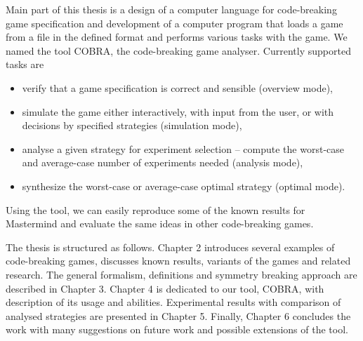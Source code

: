 Main part of this thesis is a design of a computer language for
  code-breaking game specification
  and development of a computer program that
  loads a game from a file in the defined format
  and performs various tasks with the game.
We named the tool COBRA, the code-breaking game analyser.
Currently supported tasks are
\begin{itemize}
\item verify that a game specification is correct
  and sensible (overview mode),
\item simulate the game either interactively, with input from the user, or
  with decisions by specified strategies (simulation mode),
\item analyse a given strategy for experiment selection --
  compute the worst-case and average-case number of experiments needed (analysis mode),
\item synthesize the worst-case or average-case optimal strategy (optimal mode).
\end{itemize}
Using the tool, we can easily reproduce some of the known results
  for Mastermind and evaluate the same ideas in other code-breaking games.

The thesis is structured as follows.
Chapter 2 introduces several examples of code-breaking games,
  discusses known results, variants of the games and related research.
The general formalism, definitions and symmetry breaking approach
  are described in Chapter 3.
Chapter 4 is dedicated to our tool, COBRA, with description of its usage and
  abilities.
Experimental results with comparison of analysed strategies
  are presented in Chapter 5.
Finally, Chapter 6 concludes the work with many suggestions on future work
  and possible extensions of the tool.






